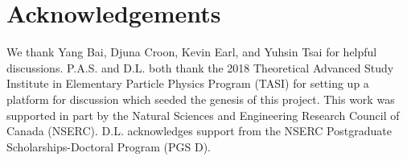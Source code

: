 \documentclass[nofootinbib,twocolumn,preprintnumbers]{revtex4-1}
\begin{document}

\section*{Acknowledgements}

We thank Yang Bai, Djuna Croon, Kevin Earl, and Yuhsin Tsai for helpful discussions. P.A.S. and D.L. both thank the 2018 Theoretical Advanced Study Institute in Elementary Particle Physics Program (TASI) for setting up a platform for discussion which seeded the genesis of this project. This work was supported in part by the Natural Sciences and Engineering Research Council of Canada (NSERC). D.L. acknowledges support from the NSERC Postgraduate Scholarships-Doctoral Program (PGS D).


\appendix


\end{document}
